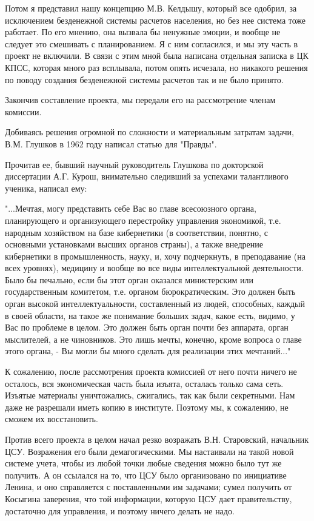 Потом я представил нашу концепцию М.В. Келдышу, который все одобрил, за
исключением безденежной системы расчетов населения, но без нее система тоже
работает. По его мнению, она вызвала бы ненужные эмоции, и вообще не следует это
смешивать с планированием. Я с ним согласился, и мы эту часть в проект не
включили. В связи с этим мной была написана отдельная записка в ЦК КПСС, которая
много раз всплывала, потом опять исчезала, но никакого решения по поводу
создания безденежной системы расчетов так и не было принято.

Закончив составление проекта, мы передали его на рассмотрение членам комиссии.

Добиваясь решения огромной по сложности и материальным затратам задачи, В.М.
Глушков в 1962 году написал статью для "Правды".

Прочитав ее, бывший научный руководитель Глушкова по докторской диссертации А.Г.
Курош, внимательно следивший за успехами талантливого ученика, написал ему:

"...Мечтая, могу представить себе Вас во главе всесоюзного органа, планирующего
и организующего перестройку управления экономикой, т.е. народным хозяйством на
базе кибернетики (в соответствии, понятно, с основными установками высших
органов страны), а также внедрение кибернетики в промышленность, науку, и, хочу
подчеркнуть, в преподавание (на всех уровнях), медицину и вообще во все виды
интеллектуальной деятельности. Было бы печально, если бы этот орган оказался
министерским или государственным комитетом, т.е. органом бюрократическим. Это
должен быть орган высокой интеллектуальности, составленный из людей, способных,
каждый в своей области, на такое же понимание больших задач, какое есть, видимо,
у Вас по проблеме в целом. Это должен быть орган почти без аппарата, орган
мыслителей, а не чиновников. Это лишь мечты, конечно, кроме вопроса о главе
этого органа, - Вы могли бы много сделать для реализации этих мечтаний..."

К сожалению, после рассмотрения проекта комиссией от него почти ничего не
осталось, вся экономическая часть была изъята, осталась только сама сеть.
Изъятые материалы уничтожались, сжигались, так как были секретными. Нам даже не
разрешали иметь копию в институте. Поэтому мы, к сожалению, не сможем их
восстановить.

Против всего проекта в целом начал резко возражать В.Н. Старовский, начальник
ЦСУ. Возражения его были демагогическими. Мы настаивали на такой новой системе
учета, чтобы из любой точки любые сведения можно было тут же получить. А он
ссылался на то, что ЦСУ было организовано по инициативе Ленина, и оно
справляется с поставленными им задачами; сумел получить от Косыгина заверения,
что той информации, которую ЦСУ дает правительству, достаточно для управления, и
поэтому ничего делать не надо.

